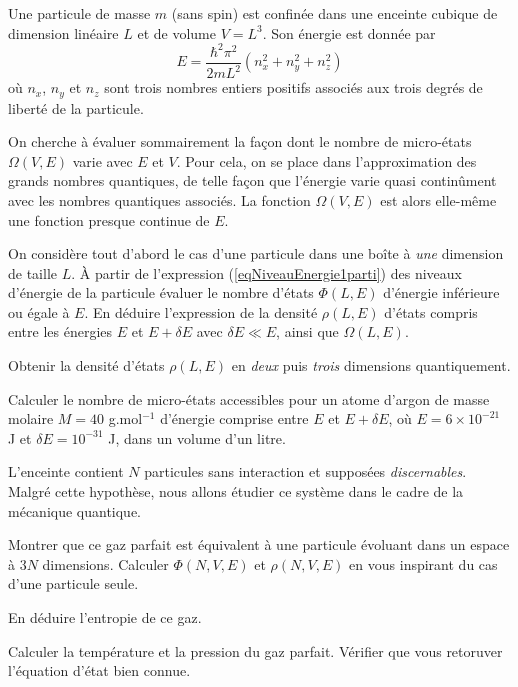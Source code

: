
Une particule de masse $m$ (sans spin) est confinée dans une enceinte cubique de dimension linéaire $L$ et de volume $V=L^3$. Son énergie est donnée par
\begin{equation} \label{eqNiveauEnergie1parti}
E=\frac{\hbar^2 \pi^2}{2mL^2} (n_{x}^{2}+n_{y}^{2}+n_{z}^{2})
\end{equation}
où $n_x$, $n_y$ et $n_z$ sont trois nombres entiers positifs associés aux trois degrés de liberté de la particule.

\medskip
On cherche à évaluer sommairement la façon dont le nombre de micro-états $\varOmega(V,E)$ varie avec $E$ et $V$. Pour cela, on se place dans l'approximation des grands nombres quantiques, de telle façon que l'énergie varie quasi continûment avec les nombres quantiques associés. La fonction $\varOmega(V,E)$ est alors elle-même une fonction presque continue de $E$.

\question
On considère tout d'abord le cas d'une particule dans une boîte à {\it une} dimension de taille $L$.  \`A partir de l'expression (\ref{eqNiveauEnergie1parti}) des niveaux d'énergie de la particule évaluer le nombre d'états $\Phi(L,E)$ d'énergie inférieure ou égale à $E$.  En déduire l'expression de la densité $\rho(L,E)$ d'états compris entre les énergies $E$ et $E + \delta E$ avec $\delta E\ll E$, ainsi que $\varOmega(L,E)$. 

\question
Obtenir la densité d'états $\rho(L,E)$ en {\it deux} puis {\it trois} dimensions quantiquement.
	
\question Calculer le nombre de micro-états accessibles pour un atome d'argon de masse molaire $M=40$ g.mol$^{-1}$ d'énergie comprise entre $E$ et $E+\delta E$, où $E=6 \times 10^{-21}$ J et $\delta E = 10^{-31}$ J, dans un volume d'un litre.

\medskip

	
L'enceinte contient $N$ particules sans interaction et supposées {\it discernables}. Malgré cette hypothèse, nous allons étudier ce système dans le cadre de la mécanique quantique.
	
\question
Montrer que ce gaz parfait est équivalent à une particule évoluant dans un espace à $3N$ dimensions. Calculer $\Phi(N,V,E)$ et $\rho(N,V,E)$ en vous inspirant du cas d'une particule seule.

\question
En déduire l'entropie de ce gaz.

\question
Calculer la température et la pression du gaz parfait. Vérifier que vous retoruver l'équation d'état bien connue.
